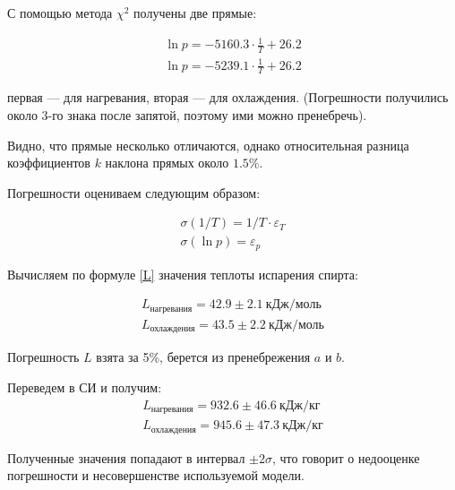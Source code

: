 \documentclass[a4paper,12pt]{report}
\begin{document}
\begin{figure}[H]
\end{figure}

\begin{multicols}{2}
    С помощью метода $\chi^2$ получены две прямые:

    \begin{gather*}
        \ln{p}=-5160.3\cdot \frac{1}{T} + 26.2 \\
        \ln{p}=-5239.1\cdot \frac{1}{T} + 26.2
    \end{gather*}

    первая --- для нагревания, вторая --- для охлаждения. (Погрешности получились около 3-го знака после запятой, поэтому ими можно пренебречь).

    Видно, что прямые несколько отличаются, однако относительная разница коэффициентов $k$ наклона прямых около $1.5\%$.

    Погрешности оцениваем следующим образом:

    \begin{gather*}
        \sigma\left(1/T\right)=1/T \cdot \varepsilon_T\\
        \sigma(\ln p)=\varepsilon_p
    \end{gather*}

    Вычисляем по формуле \eqref{L} значения теплоты испарения спирта:

    \begin{gather*}
        L_\text{нагревания}=42.9\pm 2.1\  \text{кДж/моль}\\
        L_\text{охлаждения}=43.5\pm 2.2\  \text{кДж/моль}
    \end{gather*}

    Погрешность $L$ взята за 5\%, берется из пренебрежения $a$ и $b$.

    Переведем в СИ и получим:
    \begin{gather*}
        L_\text{нагревания}=932.6\pm 46.6 \ \text{кДж/кг}\\
        L_\text{охлаждения}=945.6\pm 47.3 \ \text{кДж/кг}
    \end{gather*}

    Полученные значения попадают в интервал $\pm 2\sigma$, что говорит о недооценке погрешности и несовершенстве используемой модели.
\end{multicols}
\end{document}
